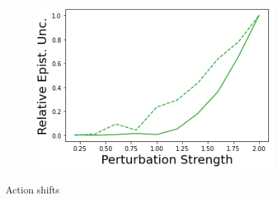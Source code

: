 \begin{figure}
\begin{subfigure}{.24\textwidth}
    \end{subfigure}
    \begin{subfigure}{.24\textwidth}
        \includegraphics[width=\textwidth]{sections/011_icml2022/resources/action_shift-PostNet-CartPoleShift-v0-mean_epistemic_uncertainty_.png}
    \end{subfigure}
    \vspace{-3mm}
    \caption*{Action shifts}
    \vspace{2mm}
    

\end{figure}
